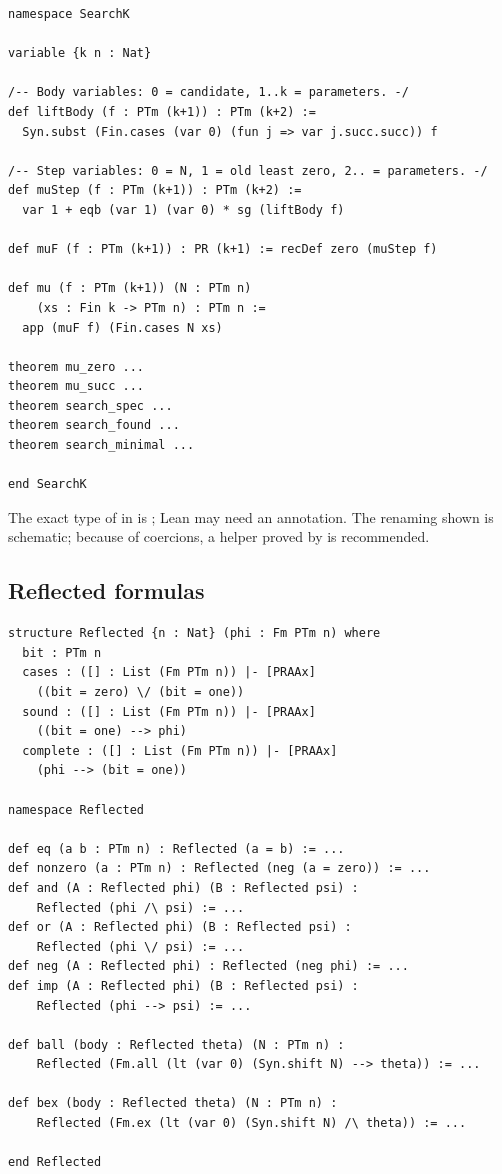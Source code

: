 \begin{lstlisting}[language=Lean]
namespace SearchK

variable {k n : Nat}

/-- Body variables: 0 = candidate, 1..k = parameters. -/
def liftBody (f : PTm (k+1)) : PTm (k+2) :=
  Syn.subst (Fin.cases (var 0) (fun j => var j.succ.succ)) f

/-- Step variables: 0 = N, 1 = old least zero, 2.. = parameters. -/
def muStep (f : PTm (k+1)) : PTm (k+2) :=
  var 1 + eqb (var 1) (var 0) * sg (liftBody f)

def muF (f : PTm (k+1)) : PR (k+1) := recDef zero (muStep f)

def mu (f : PTm (k+1)) (N : PTm n)
    (xs : Fin k -> PTm n) : PTm n :=
  app (muF f) (Fin.cases N xs)

theorem mu_zero ...
theorem mu_succ ...
theorem search_spec ...
theorem search_found ...
theorem search_minimal ...

end SearchK
\end{lstlisting}

The exact type of  in  is ; Lean may need an annotation.  The
renaming shown is schematic; because of  coercions, a helper proved by  is
recommended.

\subsection{Reflected formulas}

\begin{lstlisting}[language=Lean]
structure Reflected {n : Nat} (phi : Fm PTm n) where
  bit : PTm n
  cases : ([] : List (Fm PTm n)) |- [PRAAx]
    ((bit = zero) \/ (bit = one))
  sound : ([] : List (Fm PTm n)) |- [PRAAx]
    ((bit = one) --> phi)
  complete : ([] : List (Fm PTm n)) |- [PRAAx]
    (phi --> (bit = one))

namespace Reflected

def eq (a b : PTm n) : Reflected (a = b) := ...
def nonzero (a : PTm n) : Reflected (neg (a = zero)) := ...
def and (A : Reflected phi) (B : Reflected psi) :
    Reflected (phi /\ psi) := ...
def or (A : Reflected phi) (B : Reflected psi) :
    Reflected (phi \/ psi) := ...
def neg (A : Reflected phi) : Reflected (neg phi) := ...
def imp (A : Reflected phi) (B : Reflected psi) :
    Reflected (phi --> psi) := ...

def ball (body : Reflected theta) (N : PTm n) :
    Reflected (Fm.all (lt (var 0) (Syn.shift N) --> theta)) := ...

def bex (body : Reflected theta) (N : PTm n) :
    Reflected (Fm.ex (lt (var 0) (Syn.shift N) /\ theta)) := ...

end Reflected
\end{lstlisting}

